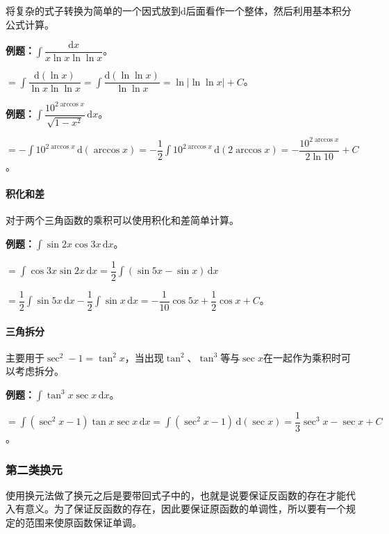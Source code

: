 \documentclass[UTF8, 12pt]{ctexart}
\begin{document}
将复杂的式子转换为简单的一个因式放到$\textrm{d}$后面看作一个整体，然后利用基本积分公式计算。

\textbf{例题：}$\displaystyle{\int\dfrac{\textrm{d}x}{x\ln x\ln\ln x}}$。 \medskip

$=\displaystyle{\int\dfrac{\textrm{d}(\ln x)}{\ln x\ln\ln x}}=\displaystyle{\int\dfrac{\textrm{d}(\ln\ln x)}{\ln\ln x}}=\ln\vert\ln\ln x\vert+C$。\medskip

\textbf{例题：}$\displaystyle{\int\dfrac{10^{2\arccos x}}{\sqrt{1-x^2}}\,\textrm{d}x}$。

$=-\displaystyle{\int10^{2\arccos x}\,\textrm{d}(\arccos x)}=-\dfrac{1}{2}\displaystyle{\int10^{2\arccos x}\,\textrm{d}(2\arccos x)}=-\dfrac{10^{2\arccos x}}{2\ln10}+C$。

\paragraph{积化和差} \leavevmode \medskip

对于两个三角函数的乘积可以使用积化和差简单计算。

\textbf{例题：}$\displaystyle{\int\sin2x\cos3x\,\textrm{d}x}$。

$=\displaystyle{\int\cos3x\sin2x\,\textrm{d}x=\dfrac{1}{2}\int(\sin5x-\sin x)\,\textrm{d}x}$

$=\dfrac{1}{2}\int\sin5x\,\textrm{d}x-\dfrac{1}{2}\int\sin x\,\textrm{d}x=-\dfrac{1}{10}\cos5x+\dfrac{1}{2}\cos x+C$。

\paragraph{三角拆分} \leavevmode \medskip

主要用于$\sec^2-1=\tan^2x$，当出现$\tan^2$、$\tan^3$等与$\sec x$在一起作为乘积时可以考虑拆分。

\textbf{例题：}$\displaystyle{\int\tan^3x\sec x\,\textrm{d}x}$。

$=\displaystyle{\int(\sec^2x-1)}\tan x\sec x\,\textrm{d}x=\displaystyle{\int(\sec^2x-1)}\,\textrm{d}(\sec x)=\dfrac{1}{3}\sec^3x-\sec x+C$。

\subsubsection{第二类换元}

使用换元法做了换元之后是要带回式子中的，也就是说要保证反函数的存在才能代入有意义。为了保证反函数的存在，因此要保证原函数的单调性，所以要有一个规定的范围来使原函数保证单调。
\end{document}
